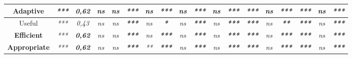 \begin{sidewaystable}[h]
\begin{tabular}{c|cc|ccccccccccccccc|}
        \multicolumn{1}{|c|}{\textbf{Adaptive}}      & \multicolumn{1}{c|}{\textit{***}} & \textit{\textbf{0,62}} & \multicolumn{1}{c|}{\textit{ns}} & \multicolumn{1}{c|}{\textit{ns}} & \multicolumn{1}{c|}{\textit{\textbf{***}}} & \multicolumn{1}{c|}{\textit{ns}}          & \multicolumn{1}{c|}{\textit{\textbf{***}}} & \multicolumn{1}{c|}{\textit{ns}} & \multicolumn{1}{c|}{\textit{\textbf{***}}} & \multicolumn{1}{c|}{\textit{ns}} & \multicolumn{1}{c|}{\textit{\textbf{***}}} & \multicolumn{1}{c|}{\textit{\textbf{***}}} & \multicolumn{1}{c|}{\textit{ns}}         & \multicolumn{1}{c|}{\textit{\textbf{***}}} & \multicolumn{1}{c|}{\textit{\textbf{***}}} & \multicolumn{1}{c|}{\textit{ns}} & \textit{\textbf{***}} \\ \hline
        \multicolumn{1}{|c|}{Useful}                 & \multicolumn{1}{c|}{\textit{***}} & \textit{0,43}          & \multicolumn{1}{c|}{\textit{ns}} & \multicolumn{1}{c|}{\textit{ns}} & \multicolumn{1}{c|}{\textit{\textbf{***}}} & \multicolumn{1}{c|}{\textit{ns}}          & \multicolumn{1}{c|}{\textit{\textbf{*}}}   & \multicolumn{1}{c|}{\textit{ns}} & \multicolumn{1}{c|}{\textit{\textbf{***}}} & \multicolumn{1}{c|}{\textit{ns}} & \multicolumn{1}{c|}{\textit{\textbf{***}}} & \multicolumn{1}{c|}{\textit{\textbf{***}}} & \multicolumn{1}{c|}{\textit{ns}}         & \multicolumn{1}{c|}{\textit{\textbf{**}}}  & \multicolumn{1}{c|}{\textit{\textbf{***}}} & \multicolumn{1}{c|}{\textit{ns}} & \textit{\textbf{***}} \\ \hline
        \multicolumn{1}{|c|}{\textbf{Efficient}}     & \multicolumn{1}{c|}{\textit{***}} & \textit{\textbf{0,62}} & \multicolumn{1}{c|}{\textit{ns}} & \multicolumn{1}{c|}{\textit{ns}} & \multicolumn{1}{c|}{\textit{\textbf{***}}} & \multicolumn{1}{c|}{\textit{ns}}          & \multicolumn{1}{c|}{\textit{\textbf{***}}} & \multicolumn{1}{c|}{\textit{ns}} & \multicolumn{1}{c|}{\textit{\textbf{***}}} & \multicolumn{1}{c|}{\textit{ns}} & \multicolumn{1}{c|}{\textit{\textbf{***}}} & \multicolumn{1}{c|}{\textit{\textbf{***}}} & \multicolumn{1}{c|}{\textit{ns}}         & \multicolumn{1}{c|}{\textit{\textbf{***}}} & \multicolumn{1}{c|}{\textit{\textbf{***}}} & \multicolumn{1}{c|}{\textit{ns}} & \textit{\textbf{***}} \\ \hline
        \multicolumn{1}{|c|}{\textbf{Appropriate}}   & \multicolumn{1}{c|}{\textit{***}} & \textit{\textbf{0,62}} & \multicolumn{1}{c|}{\textit{ns}} & \multicolumn{1}{c|}{\textit{ns}} & \multicolumn{1}{c|}{\textit{\textbf{***}}} & \multicolumn{1}{c|}{\textit{**}}          & \multicolumn{1}{c|}{\textit{\textbf{***}}} & \multicolumn{1}{c|}{\textit{ns}} & \multicolumn{1}{c|}{\textit{\textbf{***}}} & \multicolumn{1}{c|}{\textit{ns}} & \multicolumn{1}{c|}{\textit{\textbf{***}}} & \multicolumn{1}{c|}{\textit{\textbf{***}}} & \multicolumn{1}{c|}{\textit{ns}}         & \multicolumn{1}{c|}{\textit{\textbf{***}}} & \multicolumn{1}{c|}{\textit{\textbf{***}}} & \multicolumn{1}{c|}{\textit{ns}} & \textit{\textbf{***}} \\ \hline

\end{tabular}
\end{sidewaystable}
